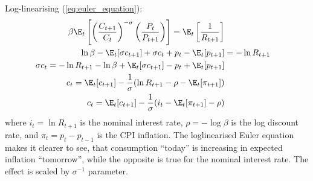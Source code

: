 Log-linearising (\ref{eq:euler_equation}):
\begin{align}
    \beta\E_t\left[\left(\frac{C_{t+1}}{C_{t}}\right)^{-\sigma} \left(\frac{P_{t}}{ P_{t+1}}\right)\right]                = \E_t \left[ \frac{1}{R_{t+1}} \right] \nonumber \\
    \ln\beta - \E_t[\sigma c_{t+1}] + \sigma c_t + p_t - \E_t [p_{t+1}] &= -\ln R_{t+1}                                              \nonumber  \\
    \sigma c_t  = -\ln R_{t+1} - \ln \beta + \E_t[\sigma c_{t+1}] - p_t + \E_t [p_{t+1}]                                             \nonumber \\
    c_t =  \E_t[c_{t+1}] - \frac{1}{\sigma}( \ln R_{t+1} - \rho - \E_t [\pi_{t+1}]   )                                             \nonumber \\
    c_t =  \E_t[c_{t+1}] - \frac{1}{\sigma}( i_t  - \E_t [\pi_{t+1}] - \rho  )                                                            
\end{align}
where $i_t = \ln R_{t+1}$ is the nominal interest rate, $\rho = -\log \beta$ is the log discount rate, and $\pi_t = p_t - p_{t-1}$ is the CPI inflation. The loglinearised Euler equation makes it clearer to see, that consumption ``today'' is increasing in expected inflation ``tomorrow'', while the opposite is true for the nominal interest rate. The effect is scaled by $\sigma^{-1}$ parameter.

